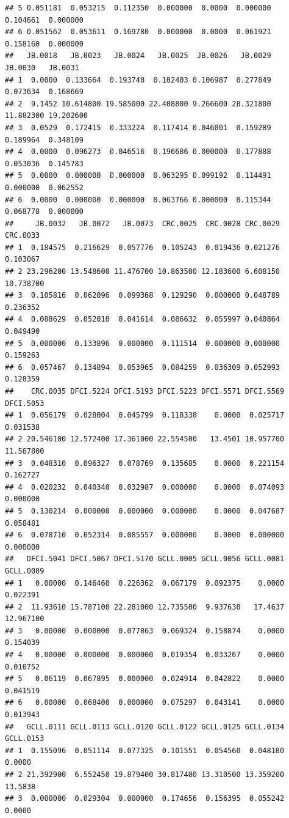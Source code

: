 \documentclass[
]{article}
\begin{document}
\begin{verbatim}
## 5 0.051181  0.053215  0.112350  0.000000  0.0000  0.000000  0.104661  0.000000
## 6 0.051562  0.053611  0.169780  0.000000  0.0000  0.061921  0.158160  0.000000
##   JB.0018   JB.0023   JB.0024   JB.0025  JB.0026   JB.0029   JB.0030   JB.0031
## 1  0.0000  0.133664  0.193748  0.102403 0.106987  0.277849  0.073634  0.168669
## 2  9.1452 10.614800 19.585000 22.408800 9.266600 28.321800 11.882300 19.202600
## 3  0.0529  0.172415  0.333224  0.117414 0.046001  0.159289  0.189964  0.348109
## 4  0.0000  0.096273  0.046516  0.196686 0.000000  0.177888  0.053036  0.145783
## 5  0.0000  0.000000  0.000000  0.063295 0.099192  0.114491  0.000000  0.062552
## 6  0.0000  0.000000  0.000000  0.063766 0.000000  0.115344  0.068778  0.000000
##     JB.0032   JB.0072   JB.0073  CRC.0025  CRC.0028 CRC.0029  CRC.0033
## 1  0.184575  0.216629  0.057776  0.105243  0.019436 0.021276  0.103067
## 2 23.296200 13.548600 11.476700 10.863500 12.183600 6.608150 10.738700
## 3  0.105816  0.062096  0.099368  0.129290  0.000000 0.048789  0.236352
## 4  0.088629  0.052010  0.041614  0.086632  0.055997 0.040864  0.049490
## 5  0.000000  0.133896  0.000000  0.111514  0.000000 0.000000  0.159263
## 6  0.057467  0.134894  0.053965  0.084259  0.036309 0.052993  0.128359
##    CRC.0035 DFCI.5224 DFCI.5193 DFCI.5223 DFCI.5571 DFCI.5569 DFCI.5053
## 1  0.056179  0.028004  0.045799  0.118338    0.0000  0.025717  0.031538
## 2 20.546100 12.572400 17.361000 22.554500   13.4501 10.957700 11.567800
## 3  0.048310  0.096327  0.078769  0.135685    0.0000  0.221154  0.162727
## 4  0.020232  0.040340  0.032987  0.000000    0.0000  0.074093  0.000000
## 5  0.130214  0.000000  0.000000  0.000000    0.0000  0.047687  0.058481
## 6  0.078710  0.052314  0.085557  0.000000    0.0000  0.000000  0.000000
##   DFCI.5041 DFCI.5067 DFCI.5170 GCLL.0005 GCLL.0056 GCLL.0081 GCLL.0089
## 1   0.00000  0.146460  0.226362  0.067179  0.092375    0.0000  0.022391
## 2  11.93610 15.787100 22.281000 12.735500  9.937630   17.4637 12.967100
## 3   0.00000  0.000000  0.077863  0.069324  0.158874    0.0000  0.154039
## 4   0.00000  0.000000  0.000000  0.019354  0.033267    0.0000  0.010752
## 5   0.06119  0.067895  0.000000  0.024914  0.042822    0.0000  0.041519
## 6   0.00000  0.068400  0.000000  0.075297  0.043141    0.0000  0.013943
##   GCLL.0111 GCLL.0113 GCLL.0120 GCLL.0122 GCLL.0125 GCLL.0134 GCLL.0153
## 1  0.155096  0.051114  0.077325  0.101551  0.054560  0.048180    0.0000
## 2 21.392900  6.552450 19.879400 30.817400 13.310500 13.359200   13.5838
## 3  0.000000  0.029304  0.000000  0.174656  0.156395  0.055242    0.0000

\end{verbatim}
\end{document}
